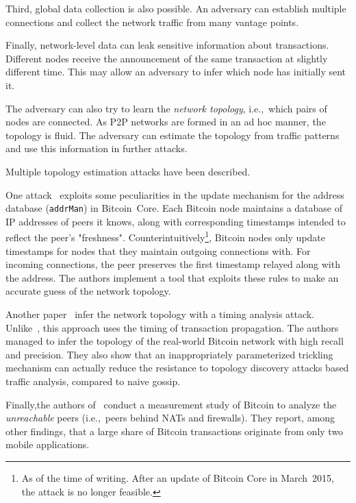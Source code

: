 Third, global data collection is also possible.
An adversary can establish multiple connections and collect the network traffic from many vantage points.

Finally, network-level data can leak sensitive information about transactions.
Different nodes receive the announcement of the same transaction at slightly different time.
This may allow an adversary to infer which node has initially sent it.

The adversary can also try to learn the \textit{network topology}, i.e.,~which pairs of nodes are connected.
As P2P networks are formed in an ad hoc manner, the topology is fluid.
The adversary can estimate the topology from traffic patterns and use this information in further attacks.

Multiple topology estimation attacks have been described.

One attack~\cite{Miller2015} exploits some peculiarities in the update mechanism for the address database (\texttt{addrMan}) in Bitcoin~Core.
Each Bitcoin node maintains a database of IP addresses of peers it knows, along with corresponding timestamps intended to reflect the peer's "freshness".
Counterintuitively\footnote{As of the time of writing. After an update of Bitcoin Core in March~2015, the attack is no longer feasible.}, Bitcoin nodes only update timestamps for nodes that they maintain outgoing connections with.
For incoming connections, the peer preserves the first timestamp relayed along with the address.
The authors implement a tool that exploits these rules to make an accurate guess of the network topology.

Another paper~\cite{Neudecker2016} infer the network topology with a timing analysis attack.
Unlike~\cite{Miller2015}, this approach uses the timing of transaction propagation.
The authors managed to infer the topology of the real-world Bitcoin network with high recall and precision.
They also show that an inappropriately parameterized trickling mechanism can actually reduce the resistance to topology discovery attacks based traffic analysis, compared to naive gossip.

Finally,the authors of~\cite{Wang2017} conduct a measurement study of Bitcoin to analyze the \textit{unreachable} peers (i.e.,~peers behind NATs and firewalls).
They report, among other findings, that a large share of Bitcoin transactions originate from only two mobile applications.


